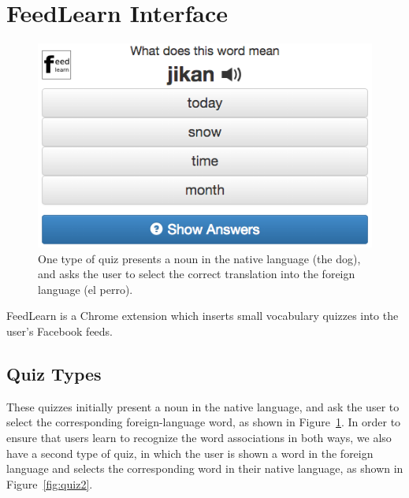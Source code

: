 \documentclass{chi-ext}
\begin{document}

\section{FeedLearn Interface}

\begin{figure}
\centering
\includegraphics[width=2.0\columnwidth]{quiz1}
\caption{One type of quiz presents a noun in the native language (the dog), and asks the user to select the correct translation into the foreign language (el perro).}
\label{fig:quiz1}
\end{figure}

FeedLearn is a Chrome extension which inserts small vocabulary quizzes into the user's Facebook feeds.

\subsection{Quiz Types}

These quizzes initially present a noun in the native language, and ask the user to select the corresponding foreign-language word, as shown in Figure~\ref{fig:quiz1}. In order to ensure that users learn to recognize the word associations in both ways, we also have a second type of quiz, in which the user is shown a word in the foreign language and selects the corresponding word in their native language, as shown in Figure~\ref{fig:quiz2}.
\end{document}
